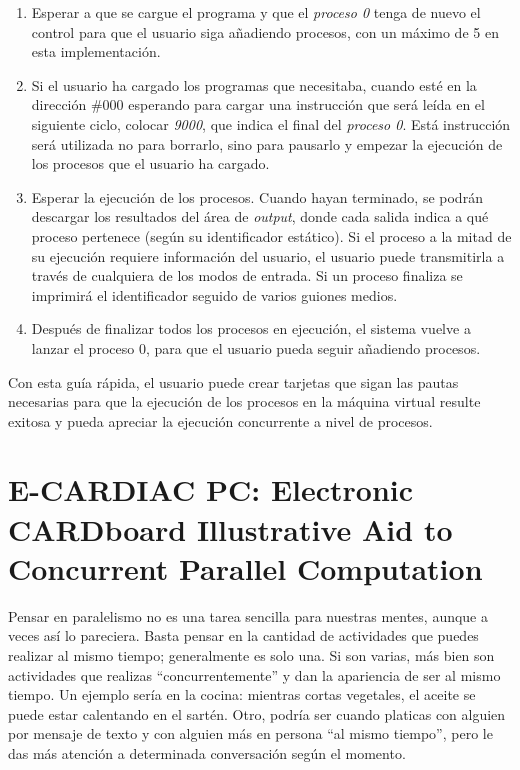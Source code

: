 \documentclass[letterpaper,12pt,oneside]{book}
\begin{document}
\begin{enumerate}
				\item Esperar a que se cargue el programa y que el \textit{proceso 0} 
				tenga de nuevo el control para que el usuario siga añadiendo procesos, con 
				un
				máximo de 5 en esta implementación.
				\item Si el usuario ha cargado los programas que necesitaba, cuando esté en la dirección \#000 esperando para cargar una instrucción
				que será leída en el siguiente ciclo, colocar \textit{9000}, que indica el final del \textit{proceso 0}. Está instrucción
				será utilizada no para borrarlo,
				sino para pausarlo y empezar la ejecución de los procesos que el usuario ha cargado.
				\item Esperar la ejecución de los procesos. Cuando hayan terminado, se podrán
				 descargar los resultados del área de \textit{output}, donde
				cada salida indica a qué proceso pertenece (según su identificador estático). Si el proceso a la mitad de su ejecución
				requiere información del usuario, el usuario puede transmitirla a través de cualquiera de los modos de entrada.
				Si un proceso finaliza se imprimirá el identificador
				seguido de varios guiones medios.
				\item Después de finalizar todos los procesos en ejecución, el sistema vuelve a lanzar el proceso 0, para que el usuario pueda
				seguir añadiendo procesos.
				
			\end{enumerate}
			
			
			Con esta guía rápida, el usuario puede crear tarjetas que sigan las pautas necesarias para que la ejecución de los procesos en
			la máquina virtual resulte exitosa y pueda apreciar la ejecución concurrente a nivel de procesos.
	
	\clearpage
	 \section{E-CARDIAC PC: Electronic CARDboard Illustrative Aid to Concurrent Parallel Computation}
	 
	 Pensar en paralelismo no es una tarea sencilla para nuestras mentes, aunque a veces así lo pareciera. Basta pensar en la cantidad de actividades
	 que puedes realizar al mismo tiempo; generalmente es solo una. Si son varias, más bien son actividades que realizas ``concurrentemente'' y
	 dan la apariencia de ser al mismo tiempo. Un ejemplo sería en la cocina: mientras cortas vegetales, el aceite se puede estar calentando en el 
	 sartén. Otro, podría ser 
	 cuando platicas con alguien por mensaje de texto
	 y con alguien más en persona ``al mismo tiempo'', pero le das más atención a determinada conversación según el momento. 
	 
\end{document}
